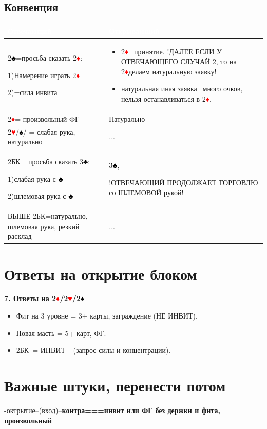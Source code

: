 \documentclass[a4paper,10pt]{article}
\newcommand{\clb}{\textcolor{black}{♣}}
\newcommand{\dia}{\textcolor{red}{♦}}
\newcommand{\hrt}{\textcolor{red}{♥}}
\newcommand{\spd}{\textcolor{black}{♠}}
\newcommand{\NT}{БК}
\begin{document}
\subsection{Конвенция}
\noindent
\begin{tabularx}{\textwidth}{|X|X|}
\hline
\rowcolor{tableHeader} \textcolor{white}{\textbf{Отвечающий}} & \textcolor{white}{\textbf{Открывающий}} \\ \hline
2\clb=просьба сказать 2\dia:

1)Намерение играть 2\dia

2)=сила инвита&
\begin{itemize}[label=\textcolor{sputnikRed}{\tiny\(\blacksquare\)}, leftmargin=*, nosep]
    \item 2\dia=принятие. !ДАЛЕЕ ЕСЛИ У ОТВЕЧАЮЩЕГО СЛУЧАЙ 2, то на 2\dia делаем натуральную заявку!
    \item натуральная иная заявка=много очков, нельзя останавливаться в 2\dia.
\end{itemize} \\ \hline
2\dia = произвольный ФГ & Натурально \\ \hline
2\hrt/\spd/ = слабая рука, натурально & ... \\ \hline
2\NT = просьба сказать 3\clb:

1)слабая рука с \clb

2)шлемовая рука с \clb & 3\clb, 

!ОТВЕЧАЮЩИЙ ПРОДОЛЖАЕТ ТОРГОВЛЮ со ШЛЕМОВОЙ рукой!\\ \hline
ВЫШЕ 2\NT=натурально, шлемовая рука, резкий расклад& ... \\ \hline
\end{tabularx}



\section{Ответы на открытие блоком}
\textbf{7. Ответы на 2\dia/2\hrt/2\spd}
\begin{itemize}[noitemsep]
    \item Фит на 3 уровне = 3+ карты, заграждение (НЕ ИНВИТ).
    \item Новая масть = 5+ карт, ФГ.
    \item 2\NT\ = ИНВИТ+ (запрос силы и концентрации).
\end{itemize}

\section{Важные штуки, перенести потом}
-октрытие--(вход)--\textbf{контра===инвит или ФГ без держки и фита, произвольный}
\end{document}
